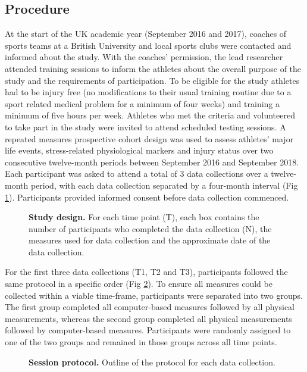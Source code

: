 \documentclass[utf8]{frontiersHLTH}
\begin{document}
\hypertarget{procedure}{%
\subsection*{Procedure}\label{procedure}}

At the start of the UK academic year (September 2016 and 2017), coaches
of sports teams at a British University and local sports clubs were
contacted and informed about the study. With the coaches' permission,
the lead researcher attended training sessions to inform the athletes
about the overall purpose of the study and the requirements of
participation. To be eligible for the study athletes had to be injury
free (no modifications to their usual training routine due to a sport
related medical problem for a minimum of four weeks) and training a
minimum of five hours per week. Athletes who met the criteria and
volunteered to take part in the study were invited to attend scheduled
testing sessions. A repeated measures prospective cohort design was used
to assess athletes' major life events, stress-related physiological
markers and injury status over two consecutive twelve-month periods
between September 2016 and September 2018. Each participant was asked to
attend a total of 3 data collections over a twelve-month period, with
each data collection separated by a four-month interval (Fig
\ref{fig:fig3}). Participants provided informed consent before data
collection commenced.

\begin{figure}[!h]
\caption{{\bf Study design.}
For each time point (T), each box contains the number of participants who completed the data collection (N), the measures used for data collection and the approximate date of the data collection.}
\label{fig:fig3}
\end{figure}

For the first three data collections (T1, T2 and T3), participants
followed the same protocol in a specific order (Fig \ref{fig:fig4}). To
ensure all measures could be collected within a viable time-frame,
participants were separated into two groups. The first group completed
all computer-based measures followed by all physical measurements,
whereas the second group completed all physical measurements followed by
computer-based measures. Participants were randomly assigned to one of
the two groups and remained in those groups across all time points.

\begin{figure}[!h]
\caption{{\bf Session protocol.}
Outline of the protocol for each data collection.}
\label{fig:fig4}
\end{figure}
\end{document}
